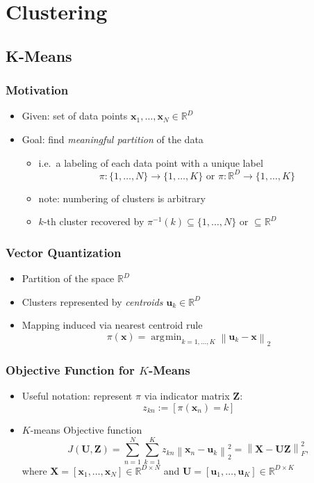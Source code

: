 \documentclass[conference,11pt]{IEEEtran}
\DeclareMathOperator*{\argmin}{\arg\!\min}
\newcommand{\iver}[1]{\left[#1\right]}
\newcommand{\norm}[1]{\left\lVert#1\right\rVert}
\newcommand{\matr}[1]{\boldsymbol{\mathbf{#1}}}
\newcommand{\vect}[1]{\boldsymbol{\mathbf{#1}}}
\newcommand{\R}{\mathbb{R}}
\begin{document}
\section{Clustering}
\subsection{K-Means}
\subsubsection{Motivation}
\begin{itemize}
  \item Given: set of data points $\vect{x}_1, \ldots, \vect{x}_N \in \R^D$
  \item Goal: find \emph{meaningful partition} of the data
    \begin{itemize}
      \item i.e.\ a labeling of each data point with a unique label
        \[
          \pi: \{1,\ldots,N\} \to \{1,\ldots,K\} \text{ or }
          \pi: \R^D \to \{1,\ldots,K\}
        \]
      \item note: numbering of clusters is arbitrary
      \item $k$-th cluster recovered by $\pi^{-1}(k) \subseteq \{1,\ldots,N\}$
        or $\subseteq \R^D$
    \end{itemize}
\end{itemize}

\subsubsection{Vector Quantization}
\begin{itemize}
  \item Partition of the space $\R^D$
  \item Clusters represented by \emph{centroids} $\vect{u}_k \in \R^D$
  \item Mapping induced via nearest centroid rule
    \[ \pi(\vect{x}) = \argmin_{k=1,\ldots,K} \norm{\vect{u}_k - \vect{x}}_2 \]
\end{itemize}

\subsubsection{Objective Function for $K$-Means}
\begin{itemize}
  \item Useful notation: represent $\pi$ via indicator matrix $\matr{Z}$:
    \[ z_{kn} := \iver{\pi(\vect{x}_n) = k} \]
  \item $K$-means Objective function
    \[
      J(\matr{U},\matr{Z}) = \sum_{n=1}^N \sum_{k=1}^K z_{kn} \norm{\vect{x}_n
        - \vect{u}_k}_2^2 = \norm{\matr{X} - \matr{U}\matr{Z}}_F^2,
    \]
    where $\matr{X} = [\vect{x}_1,\ldots,\vect{x}_N] \in \R^{D \times N}$
    and   $\matr{U} = [\vect{u}_1,\ldots,\vect{u}_K] \in \R^{D \times K}$
\end{itemize}
\end{document}
